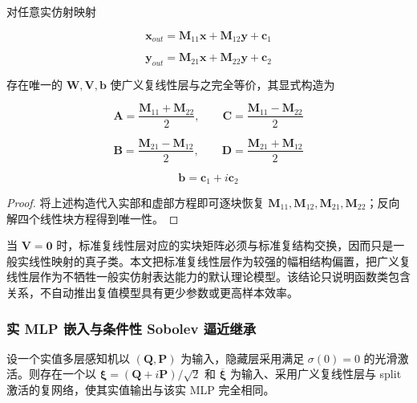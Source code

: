 \begin{proposition}[实仿射完备性]\label{prop:real-affine-completeness}
对任意实仿射映射

\begin{equation}
\label{eq:chnn-4-11}
\mathbf{x}_{out} = \mathbf{M}_{11}\mathbf{x} + \mathbf{M}_{12}\mathbf{y} + \mathbf{c}_{1}
\end{equation}

\begin{equation}
\label{eq:chnn-4-12}
\mathbf{y}_{out} = \mathbf{M}_{21}\mathbf{x} + \mathbf{M}_{22}\mathbf{y} + \mathbf{c}_{2}
\end{equation}

存在唯一的 \(\mathbf{W},\mathbf{V},\mathbf{b}\) 使广义复线性层与之完全等价，其显式构造为

\begin{equation}
\label{eq:chnn-4-13}
\mathbf{A} = \frac{\mathbf{M}_{11} + \mathbf{M}_{22}}{2},\quad\quad\mathbf{C} = \frac{\mathbf{M}_{11} - \mathbf{M}_{22}}{2}
\end{equation}

\begin{equation}
\label{eq:chnn-4-14}
\mathbf{B} = \frac{\mathbf{M}_{21} - \mathbf{M}_{12}}{2},\quad\quad\mathbf{D} = \frac{\mathbf{M}_{21} + \mathbf{M}_{12}}{2}
\end{equation}

\begin{equation}
\label{eq:chnn-4-15}
\mathbf{b} = \mathbf{c}_{1} + i\mathbf{c}_{2}
\end{equation}
\end{proposition}

\begin{proof} 将上述构造代入实部和虚部方程即可逐块恢复 \(\mathbf{M}_{11},\mathbf{M}_{12},\mathbf{M}_{21},\mathbf{M}_{22}\)；反向解四个线性块方程得到唯一性。\end{proof}

当 \(\mathbf{V} = \mathbf{0}\) 时，标准复线性层对应的实块矩阵必须与标准复结构交换，因而只是一般实线性映射的真子类。本文把标准复线性层作为较强的幅相结构偏置，把广义复线性层作为不牺牲一般实仿射表达能力的默认理论模型。该结论只说明函数类包含关系，不自动推出复值模型具有更少参数或更高样本效率。

\subsubsection{实 MLP 嵌入与条件性 Sobolev 逼近继承}\label{sec:chnn-4-2-4}

\begin{theorem}\label{thm:real-mlp-embedding}
设一个实值多层感知机以 \(\left( \mathbf{Q},\mathbf{P} \right)\) 为输入，隐藏层采用满足 \(\sigma(0) = 0\) 的光滑激活。则存在一个以 \(\bm{\xi} = \left( \mathbf{Q} + i\mathbf{P} \right)/\sqrt{2}\) 和 \(\overline{\bm{\xi}}\) 为输入、采用广义复线性层与 split 激活的复网络，使其实值输出与该实 MLP 完全相同。
\end{theorem}

